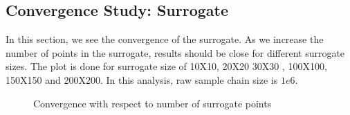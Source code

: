 \subsection{Convergence Study: Surrogate }

In this section, we see the convergence of the surrogate. As we increase the number of points in the surrogate, results should be close for different surrogate sizes. The plot is done for surrogate size of 10X10, 20X20 30X30 , 100X100, 150X150 and 200X200. In this analysis, raw sample chain size is $1e6$.

\begin{figure}[H]
            \caption{Convergence with respect to number of surrogate points}
\end{figure}

